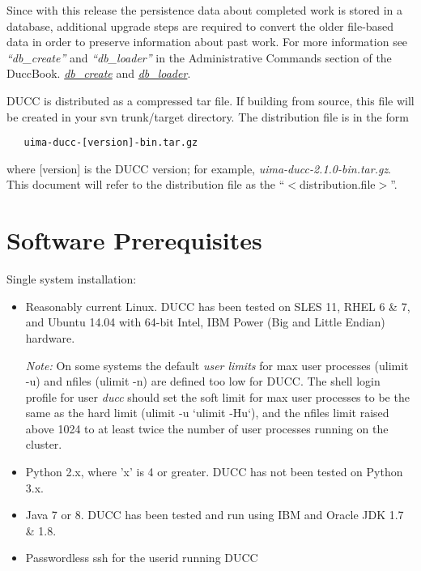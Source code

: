 Since with this release the persistence data about completed work is stored in a database, 
additional upgrade steps are required to convert the older file-based data in order to preserve information 
about past work. 
For more information see
\ifdefined\DUCCSTANDALONE
{\em ``db\_create''} and {\em ``db\_loader''} in the Administrative Commands section of the DuccBook. 
\else
\hyperref[subsec:admin.db-create] {\em db\_create} and \hyperref[subsec:admin.db-loader] {\em db\_loader}. 
\fi


DUCC is distributed as a compressed tar file.  If building from source, this file will be created in your svn
trunk/target directory. The distribution file is in the form
\begin{verbatim}
   uima-ducc-[version]-bin.tar.gz
\end{verbatim}
where [version] is the DUCC version; for example, {\em uima-ducc-2.1.0-bin.tar.gz}.  This document will refer to the distribution
file as the ``$<$distribution.file$>$''.

\section{Software Prerequisites}
\label{sec:install.prerequisites}

Single system installation:

\begin{itemize}
  \item Reasonably current Linux.  DUCC has been tested on SLES 11, RHEL 6 \& 7, and Ubuntu 14.04 
    with 64-bit Intel, IBM Power (Big and Little Endian) hardware.
    
    {\em Note:} On some systems the default {\em user limits}
    for max user processes (ulimit -u) and nfiles (ulimit -n) are defined too
    low for DUCC. The shell login profile for user {\em ducc} should set the
    soft limit for max user processes to be the same as the hard limit
    (ulimit -u `ulimit -Hu`), and
    the nfiles limit raised above 1024 to at least twice the number of user
    processes running on the cluster.

  \item Python 2.x, where 'x' is 4 or greater.  DUCC has not been tested on Python 3.x.
  \item Java 7 or 8. DUCC has been tested and run using IBM and Oracle JDK 1.7 \& 1.8.
  \item Passwordless ssh for the userid running DUCC
\end{itemize}
  
